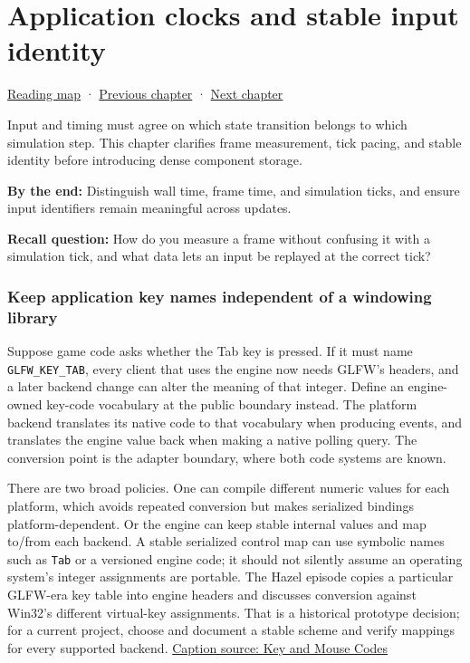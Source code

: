\chapter{Application clocks and stable input identity}\label{05-engine-i-ch014-application-clocks-and-stable-input-identity}\hypertarget{05-engine-i-ch014}{}\label{stagechapter:05-engine-i-ch014}

\hypertarget{05-engine-i-ch014-application-clocks-and-stable-input-identity}{}

\hyperref[volume-reading-map]{Reading map} · \hyperref[05-engine-i-ch013-portable-startup-windows-events-and-input]{Previous chapter} · \hyperref[05-engine-i-ch015-sparse-set-components-and-generational-entity-handles]{Next chapter}

Input and timing must agree on which state transition belongs to which simulation step. This chapter clarifies frame measurement, tick pacing, and stable identity before introducing dense component storage.

\textbf{By the end:} Distinguish wall time, frame time, and simulation ticks, and ensure input identifiers remain meaningful across updates.

\textbf{Recall question:} How do you measure a frame without confusing it with a simulation tick, and what data lets an input be replayed at the correct tick?

\subsection{Keep application key names independent of a windowing library}\label{05-engine-i-ch014-keep-application-key-names-independent-of-a-windowing-library}

\hypertarget{05-engine-i-ch014-keep-application-key-names-independent-of-a-windowing-library}{}

Suppose game code asks whether the Tab key is pressed. If it must name \texttt{GLFW\_KEY\_TAB}, every client that uses the engine now needs GLFW's headers, and a later backend change can alter the meaning of that integer. Define an engine-owned key-code vocabulary at the public boundary instead. The platform backend translates its native code to that vocabulary when producing events, and translates the engine value back when making a native polling query. The conversion point is the adapter boundary, where both code systems are known.

There are two broad policies. One can compile different numeric values for each platform, which avoids repeated conversion but makes serialized bindings platform-dependent. Or the engine can keep stable internal values and map to/from each backend. A stable serialized control map can use symbolic names such as \texttt{Tab} or a versioned engine code; it should not silently assume an operating system's integer assignments are portable. The Hazel episode copies a particular GLFW-era key table into engine headers and discusses conversion against Win32's different virtual-key assignments. That is a historical prototype decision; for a current project, choose and document a stable scheme and verify mappings for every supported backend. \href{https://www.youtube.com/watch?v=zaJGn8pur5I}{Caption source: Key and Mouse Codes}

